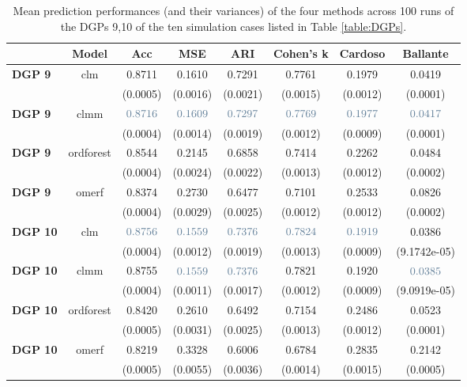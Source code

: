 \begin{table}[H]
    \centering 
    \begin{tabular}{|p{4em} c c c c c c c |}
    \hline
    \rowcolor{bluePoli!40}
    & \textbf{Model} & \textbf{Acc} & \textbf{MSE} & \textbf{ARI} & \textbf{Cohen's k} & \textbf{Cardoso} & \textbf{Ballante} \T\B \\
    \hline \hline
    \textbf{DGP 9} & clm & 0.8711 & 0.1610 & 0.7291 & 0.7761 & 0.1979 & 0.0419 \T\B \\
    \textbf{} &  & (0.0005) & (0.0016) & (0.0021)  & (0.0015)  & (0.0012)  & (0.0001) \T\B \\
    \textbf{DGP 9} & clmm & $\textcolor{bluePoli}{0.8716}$ & $\textcolor{bluePoli}{0.1609}$ & $\textcolor{bluePoli}{0.7297}$ & $\textcolor{bluePoli}{0.7769}$ & $\textcolor{bluePoli}{0.1977}$ & $\textcolor{bluePoli}{0.0417}$ \T\B \\
    \textbf{} &  & (0.0004) & (0.0014) & (0.0019)  & (0.0012)  & (0.0009)  & (0.0001) \T\B \\
    \textbf{DGP 9} & ordforest & 0.8544 & 0.2145 & 0.6858 & 0.7414 & 0.2262 & 0.0484 \T\B \\
    \textbf{} &  & (0.0004) & (0.0024) & (0.0022)  & (0.0013)  & (0.0012)  & (0.0002) \T\B \\
    \textbf{DGP 9} & omerf & 0.8374 & 0.2730 & 0.6477 & 0.7101 & 0.2533 & 0.0826 \T\B \\
    \textbf{} &  & (0.0004) & (0.0029) & (0.0025)  & (0.0012)  & (0.0012)  & (0.0002) \T\B \\
    \hline
    \textbf{DGP 10} & clm & $\textcolor{bluePoli}{0.8756}$ & $\textcolor{bluePoli}{0.1559}$ & $\textcolor{bluePoli}{0.7376}$ & $\textcolor{bluePoli}{0.7824}$ & $\textcolor{bluePoli}{0.1919}$ & 0.0386 \T\B \\
    \textbf{} &  & (0.0004) & (0.0012) & (0.0019)  & (0.0013)  & (0.0009)  & (9.1742e-05) \T\B \\
    \textbf{DGP 10} & clmm & 0.8755 & $\textcolor{bluePoli}{0.1559}$ & $\textcolor{bluePoli}{0.7376}$ & 0.7821 & 0.1920 & $\textcolor{bluePoli}{0.0385}$ \T\B \\
    \textbf{} &  & (0.0004) & (0.0011) & (0.0017)  & (0.0012)  & (0.0009)  & (9.0919e-05) \T\B \\
    \textbf{DGP 10} & ordforest & 0.8420 & 0.2610 & 0.6492 & 0.7154 & 0.2486 & 0.0523 \T\B \\
    \textbf{} &  & (0.0005) & (0.0031) & (0.0025)  & (0.0013)  & (0.0012)  & (0.0001) \T\B \\
    \textbf{DGP 10} & omerf & 0.8219 & 0.3328 & 0.6006 & 0.6784 & 0.2835 & 0.2142 \T\B \\
    \textbf{} &  & (0.0005) & (0.0055) & (0.0036)  & (0.0014)  & (0.0015)  & (0.0005) \B \\
    \hline
    \end{tabular}
    \\[10pt]
    \caption{Mean prediction performances (and their variances) of the four methods across 100 runs of the DGPs 9,10 of the ten simulation cases listed in Table \ref{table:DGPs}.}
    \label{table:res_lin}
\end{table}



